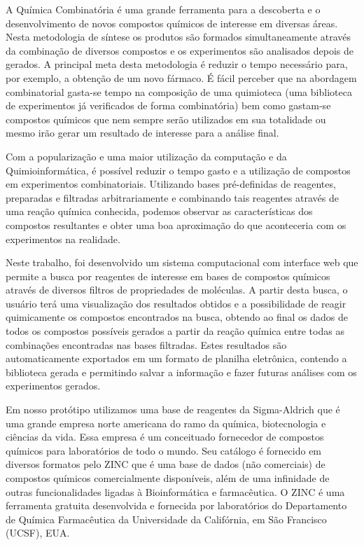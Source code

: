 \documentclass{abnt}
\begin{document}
A Química Combinatória é uma grande ferramenta para a descoberta e o desenvolvimento
de novos compostos químicos de interesse em diversas áreas. Nesta metodologia de
síntese os produtos são formados simultaneamente através da combinação de diversos
compostos e os experimentos são analisados depois de gerados. A principal meta desta
metodologia é reduzir o tempo necessário para, por exemplo, a obtenção de um novo
fármaco. É fácil perceber que na abordagem combinatorial gasta-se tempo na composição
de uma quimioteca (uma biblioteca de experimentos já verificados de forma combinatória)
bem como gastam-se compostos químicos que nem sempre serão utilizados em sua totalidade
ou mesmo irão gerar um resultado de interesse para a análise final.

Com a popularização e uma maior utilização da computação e da Quimioinformática,
é possível reduzir o tempo gasto e a utilização de compostos em experimentos combinatoriais.
Utilizando bases pré-definidas de reagentes, preparadas e filtradas arbitrariamente
e combinando tais reagentes através de uma reação química conhecida, podemos observar
as características dos compostos resultantes e obter uma boa aproximação do que
aconteceria com os experimentos na realidade.

Neste trabalho, foi desenvolvido um sistema computacional com interface web que
permite a busca por reagentes de interesse em bases de compostos químicos através
de diversos filtros de propriedades de moléculas. A partir desta busca, o usuário
terá uma visualização dos resultados obtidos e a possibilidade de reagir quimicamente
os compostos encontrados na busca, obtendo ao final os dados de todos os compostos
possíveis gerados a partir da reação química entre todas as combinações encontradas
nas bases filtradas. Estes resultados são automaticamente exportados em um formato
de planilha eletrônica, contendo a biblioteca gerada e permitindo salvar a informação
e fazer futuras análises com os experimentos gerados.

Em nosso protótipo utilizamos uma base de reagentes da Sigma-Aldrich que é uma grande
empresa norte americana do ramo da química, biotecnologia e ciências da vida. Essa
empresa é um conceituado fornecedor de compostos químicos para laboratórios de todo
o mundo. Seu catálogo é fornecido em diversos formatos pelo ZINC que é uma base de
dados (não comerciais) de compostos químicos comercialmente disponíveis, além de
uma infinidade de outras funcionalidades ligadas à Bioinformática e farmacêutica.
O ZINC é uma ferramenta gratuita desenvolvida e fornecida por laboratórios do Departamento
de Química Farmacêutica da Universidade da Califórnia, em São Francisco (UCSF),
EUA.
\end{document}
